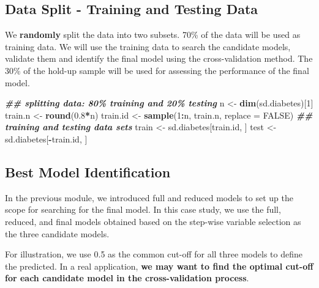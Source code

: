 \documentclass[
]{book}
\newenvironment{Shaded}{\begin{snugshade}}{\end{snugshade}}
\newcommand{\AttributeTok}[1]{\textcolor[rgb]{0.13,0.29,0.53}{#1}}
\newcommand{\ConstantTok}[1]{\textcolor[rgb]{0.56,0.35,0.01}{#1}}
\newcommand{\DecValTok}[1]{\textcolor[rgb]{0.00,0.00,0.81}{#1}}
\newcommand{\DocumentationTok}[1]{\textcolor[rgb]{0.56,0.35,0.01}{\textbf{\textit{#1}}}}
\newcommand{\FloatTok}[1]{\textcolor[rgb]{0.00,0.00,0.81}{#1}}
\newcommand{\FunctionTok}[1]{\textcolor[rgb]{0.13,0.29,0.53}{\textbf{#1}}}
\newcommand{\NormalTok}[1]{#1}
\newcommand{\OtherTok}[1]{\textcolor[rgb]{0.56,0.35,0.01}{#1}}
\newcommand{\SpecialCharTok}[1]{\textcolor[rgb]{0.81,0.36,0.00}{\textbf{#1}}}
\begin{document}
\hypertarget{data-split---training-and-testing-data}{%
\subsection{Data Split - Training and Testing Data}\label{data-split---training-and-testing-data}}

We \textbf{randomly} split the data into two subsets. 70\% of the data will be used as training data. We will use the training data to search the candidate models, validate them and identify the final model using the cross-validation method. The 30\% of the hold-up sample will be used for assessing the performance of the final model.

\begin{Shaded}
\begin{Highlighting}[]
\DocumentationTok{\#\# splitting data: 80\% training and 20\% testing}
\NormalTok{n }\OtherTok{\textless{}{-}} \FunctionTok{dim}\NormalTok{(sd.diabetes)[}\DecValTok{1}\NormalTok{]}
\NormalTok{train.n }\OtherTok{\textless{}{-}} \FunctionTok{round}\NormalTok{(}\FloatTok{0.8}\SpecialCharTok{*}\NormalTok{n)}
\NormalTok{train.id }\OtherTok{\textless{}{-}} \FunctionTok{sample}\NormalTok{(}\DecValTok{1}\SpecialCharTok{:}\NormalTok{n, train.n, }\AttributeTok{replace =} \ConstantTok{FALSE}\NormalTok{)}
\DocumentationTok{\#\# training and testing data sets}
\NormalTok{train }\OtherTok{\textless{}{-}}\NormalTok{ sd.diabetes[train.id, ]}
\NormalTok{test }\OtherTok{\textless{}{-}}\NormalTok{ sd.diabetes[}\SpecialCharTok{{-}}\NormalTok{train.id, ]}
\end{Highlighting}
\end{Shaded}

\hypertarget{best-model-identification}{%
\subsection{Best Model Identification}\label{best-model-identification}}

In the previous module, we introduced full and reduced models to set up the scope for searching for the final model. In this case study, we use the full, reduced, and final models obtained based on the step-wise variable selection as the three candidate models.

For illustration, we use 0.5 as the common cut-off for all three models to define the predicted. In a real application, \textbf{we may want to find the optimal cut-off for each candidate model in the cross-validation process}.
\end{document}
